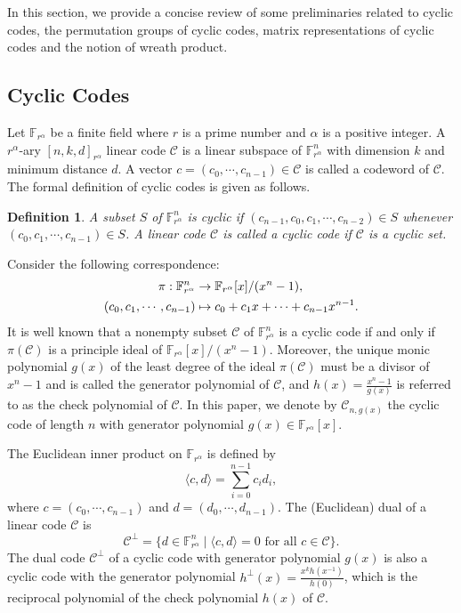 \documentclass[journal,12pt,onecolumn]{IEEEtran}
\newtheorem{definition}{Definition}
\begin{document}
In this section, we provide a concise review of some preliminaries related to cyclic codes, the permutation groups of cyclic codes, matrix representations of cyclic codes and the notion of wreath product. 

\subsection{Cyclic Codes}

Let $\mathbb{F}_{r^\alpha}$ be a finite field where $r$ is a prime number and $\alpha$ is a positive integer. A $r^\alpha$-ary $[n,k,d]_{r^\alpha}$ linear code $\mathcal{C}$ is a linear subspace of $\mathbb{F}_{r^\alpha}^n$ with dimension $k$ and minimum distance $d$. A vector $c = (c_0,\cdots,c_{n-1})\in \mathcal{C}$ is called a codeword of $\mathcal{C}$. The formal definition of cyclic codes is given as follows.

 
\begin{definition}\cite[Def. 7.1.1]{Ling_Xing_2004}
    A subset $S$ of $\mathbb{F}_{r^\alpha}^n$ is cyclic if $(c_{n-1},c_0,c_1,\cdots,c_{n-2})\in S$ whenever $(c_0,c_1,\cdots,c_{n-1})\in S$. A linear code $\mathcal{C}$ is called a cyclic code if $\mathcal{C}$ is a cyclic set. 
\end{definition}
 

Consider the following correspondence:
\begin{align}\label{cyc_poly_cor}
    \pi : \mathbb{F}_{r^\alpha}^n&\rightarrow \mathbb{F}_{r^\alpha}[x]/(x^n-1),\notag\\
    (c_0,c_1,\cdots,c_{n-1})&\mapsto c_0 + c_1x + \cdots + c_{n-1}x^{n-1}.
\end{align}
It is well known that a nonempty subset $\mathcal{C}$ of $\mathbb{F}_{r^\alpha}^n$ is a cyclic code if and only if $\pi(\mathcal{C})$ is a principle ideal of $\mathbb{F}_{r^\alpha}[x]/(x^n-1)$. Moreover, the unique monic polynomial $g(x)$ of the least degree of the ideal $\pi(\mathcal{C})$ must be a divisor of $x^n-1$ and is called the generator polynomial of $\mathcal{C}$, and $h(x) = \frac{x^n-1}{g(x)}$ is referred to as the check polynomial of $\mathcal{C}$. In this paper, we denote by $\mathcal{C}_{n,g(x)}$ the cyclic code of length \(n\) with generator polynomial $g(x)\in\mathbb{F}_{r^\alpha}[x]$. 

The Euclidean inner product on $\mathbb{F}_{r^\alpha}$ is defined by
\[
    \langle c,d \rangle = \sum_{i=0}^{n-1} c_id_i,
\]
where $c = (c_0,\cdots,c_{n-1})$ and $d = (d_0,\cdots,d_{n-1})$. The (Euclidean) dual of a linear code $\mathcal{C}$ is 
\[
    \mathcal{C}^\perp = \{d\in\mathbb{F}_{r^\alpha}^n\mid \langle c,d \rangle = 0\text{ for all } c\in \mathcal{C}\}. 
\]
The dual code $\mathcal{C}^\perp$ of a cyclic code with generator polynomial $g(x)$ is also a cyclic code with the generator polynomial $h^\perp(x) = \frac{x^kh(x^{-1})}{h(0)}$, which is the reciprocal polynomial of the check polynomial $h(x)$ of $\mathcal{C}$. 
\end{document}
